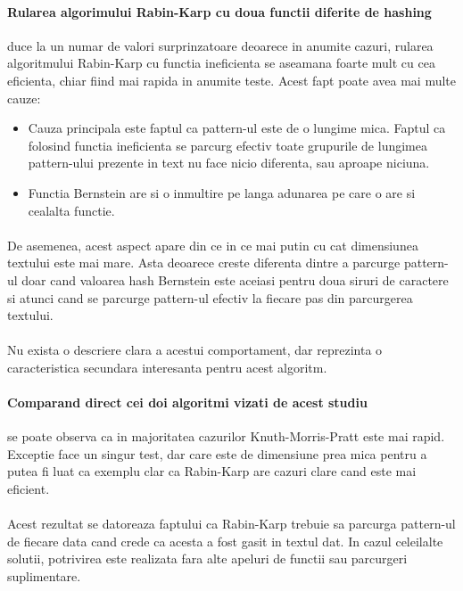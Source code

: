 \documentclass[runningheads]{llncs}
\begin{document}
\paragraph{Rularea algorimului Rabin-Karp cu doua functii diferite de hashing} duce la un numar de valori surprinzatoare deoarece in anumite cazuri, rularea algoritmului Rabin-Karp cu functia ineficienta se aseamana foarte mult cu cea eficienta, chiar fiind mai rapida in anumite teste. Acest fapt poate avea mai multe cauze: 
\begin{itemize}
\item Cauza principala este faptul ca pattern-ul este de o lungime mica.
Faptul ca folosind functia ineficienta se parcurg efectiv toate grupurile de lungimea pattern-ului prezente in text nu face nicio diferenta, sau aproape niciuna.
\item Functia Bernstein are si o inmultire pe langa adunarea pe care o are si cealalta functie.
\end{itemize}
\paragraph{} De asemenea, acest aspect apare din ce in ce mai putin cu cat dimensiunea
	textului este mai mare. Asta deoarece creste diferenta dintre a parcurge
	pattern-ul doar cand valoarea hash Bernstein este aceiasi pentru doua
	siruri de caractere si atunci cand se parcurge pattern-ul efectiv la fiecare
	pas din parcurgerea textului.
	\paragraph{} Nu exista o descriere clara a acestui comportament, dar reprezinta o caracteristica secundara interesanta pentru acest algoritm.
\\ 

\paragraph{Comparand direct cei doi algoritmi vizati de acest studiu} se poate observa ca in majoritatea cazurilor Knuth-Morris-Pratt este mai rapid. Exceptie face un singur test, dar care este de dimensiune prea mica pentru a putea fi luat ca exemplu clar ca Rabin-Karp are cazuri clare cand este mai eficient.
\paragraph{} Acest rezultat se datoreaza faptului ca Rabin-Karp trebuie sa parcurga pattern-ul de fiecare data cand crede ca acesta a fost gasit in textul dat. In cazul celeilalte solutii, potrivirea este realizata fara alte apeluri de functii sau parcurgeri suplimentare.
\end{document}
